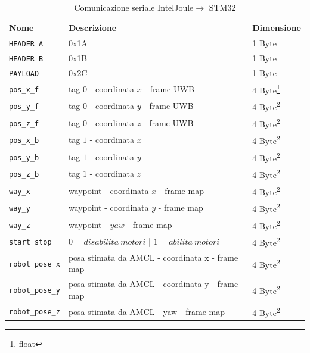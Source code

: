 \begin{savenotes}
\begin{table}[h]
\begin{minipage}{\textwidth}
\renewcommand\thempfootnote{\arabic{mpfootnote}}
\footnotesize
\caption{Comunicazione seriale Intel\textsuperscript\textregistered Joule\texttrademark\hspace{1mm}$\rightarrow$ STM32\textsuperscript\textregistered}
\centering
\label{table:comunicazione_seriale2stm}
\begin{tabular}{lll}
\toprule
Nome                 & Descrizione                                & Dimensione\\
\midrule
\verb!HEADER_A!      & 0x1A                                       & 1 Byte\\
\verb!HEADER_B!      & 0x1B                                       & 1 Byte\\
\verb!PAYLOAD!       & 0x2C                                       & 1 Byte\\
\hline
\verb!pos_x_f!       & tag $0$ - coordinata $x$ - frame UWB       & 4 Byte\footnote{float}\\
\verb!pos_y_f!       & tag $0$ - coordinata $y$ - frame UWB       & 4 Byte\textsuperscript{2}\\
\verb!pos_z_f!       & tag $0$ - coordinata $z$ - frame UWB       & 4 Byte\textsuperscript{2}\\
\hline
\verb!pos_x_b!       & tag $1$ - coordinata $x$                   & 4 Byte\textsuperscript{2}\\
\verb!pos_y_b!       & tag $1$ - coordinata $y$                   & 4 Byte\textsuperscript{2}\\
\verb!pos_z_b!       & tag $1$ - coordinata $z$                   & 4 Byte\textsuperscript{2}\\
\hline
\verb!way_x!         & waypoint - coordinata $x$ - frame map    & 4 Byte\textsuperscript{2}\\
\verb!way_y!         & waypoint - coordinata $y$ - frame map    & 4 Byte\textsuperscript{2}\\
\verb!way_z!         & waypoint - $yaw$  - frame map            & 4 Byte\textsuperscript{2}\\
\hline
\verb!start_stop!    & $0 = disabilita\ motori$ | $1 = abilita\ motori$       & 4 Byte\textsuperscript{2}\\
\hline
\verb!robot_pose_x!  & posa stimata da AMCL - coordinata x - frame map   & 4 Byte\textsuperscript{2}\\
\verb!robot_pose_y!  & posa stimata da AMCL - coordinata y - frame map   & 4 Byte\textsuperscript{2}\\
\verb!robot_pose_z!  & posa stimata da AMCL - yaw - frame map            & 4 Byte\textsuperscript{2}\\

\bottomrule
\end{tabular}
\end{minipage}
\end{table}
\end{savenotes}

